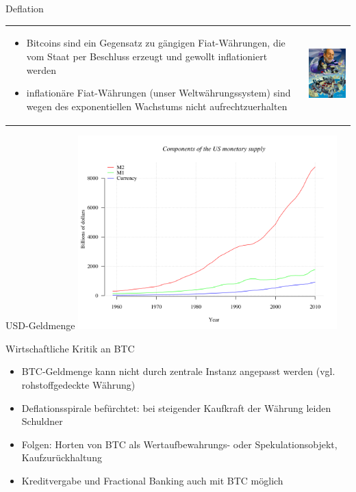 \documentclass[handout]{beamer} \usepackage[german]{babel}
\begin{document}
\begin{frame}{Deflation}
	\begin{tabular}{l l}
	\begin{minipage}{0.6\textwidth}
	\begin{itemize}
		\item Bitcoins sind ein Gegensatz zu gängigen Fiat-Währungen, die vom
			Staat per Beschluss erzeugt und gewollt inflationiert werden
		\item inflationäre Fiat-Währungen (unser Weltwährungssystem) sind wegen
			des exponentiellen Wachstums nicht aufrechtzuerhalten
	\end{itemize}
	\end{minipage}
	&
	\begin{minipage}{0.4\textwidth}
	\includegraphics[width=35mm]{btcvortrag/helicopter-ben.jpg}
\end{minipage}
	\end{tabular}
\end{frame}

\begin{frame}{USD-Geldmenge}
	\includegraphics[height=75mm]{btcvortrag/usd-geldmenge.jpg}
\end{frame}

\begin{frame}{Wirtschaftliche Kritik an BTC}
	\begin{itemize}
		\item BTC-Geldmenge kann nicht durch zentrale Instanz angepasst werden
			(vgl. rohstoffgedeckte Währung)
		\item Deflationsspirale befürchtet: bei steigender Kaufkraft der Währung leiden Schuldner
		\item Folgen: Horten von BTC als Wertaufbewahrungs- oder
			Spekulationsobjekt, Kaufzurückhaltung
		\item Kreditvergabe und Fractional Banking auch mit BTC möglich
	\end{itemize}
\end{frame}
\end{document}
